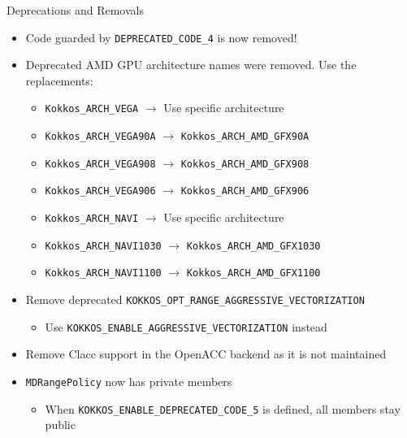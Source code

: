\begin{frame}[fragile]{Deprecations and Removals}
  \begin{itemize}
      \item Code guarded by \texttt{DEPRECATED\_CODE\_4} is now removed!
      \item Deprecated AMD GPU architecture names were removed. Use the replacements:
      \begin{itemize}
        \item \texttt{Kokkos\_ARCH\_VEGA} $\rightarrow$ Use specific architecture
        \item \texttt{Kokkos\_ARCH\_VEGA90A} $\rightarrow$ \texttt{Kokkos\_ARCH\_AMD\_GFX90A}
        \item \texttt{Kokkos\_ARCH\_VEGA908} $\rightarrow$ \texttt{Kokkos\_ARCH\_AMD\_GFX908}
        \item \texttt{Kokkos\_ARCH\_VEGA906} $\rightarrow$ \texttt{Kokkos\_ARCH\_AMD\_GFX906}
        \item \texttt{Kokkos\_ARCH\_NAVI} $\rightarrow$ Use specific architecture
        \item \texttt{Kokkos\_ARCH\_NAVI1030} $\rightarrow$ \texttt{Kokkos\_ARCH\_AMD\_GFX1030}
        \item \texttt{Kokkos\_ARCH\_NAVI1100} $\rightarrow$ \texttt{Kokkos\_ARCH\_AMD\_GFX1100}
      \end{itemize}
      \item Remove deprecated \texttt{KOKKOS\_OPT\_RANGE\_AGGRESSIVE\_VECTORIZATION}
      \begin{itemize}
        \item Use \texttt{KOKKOS\_ENABLE\_AGGRESSIVE\_VECTORIZATION} instead
      \end{itemize}
      \item Remove Clacc support in the OpenACC backend as it is not maintained
      \item \texttt{MDRangePolicy} now has private members
      \begin{itemize}
        \item When \texttt{KOKKOS\_ENABLE\_DEPRECATED\_CODE\_5} is defined, all members stay public
      \end{itemize}
  \end{itemize}
\end{frame}





